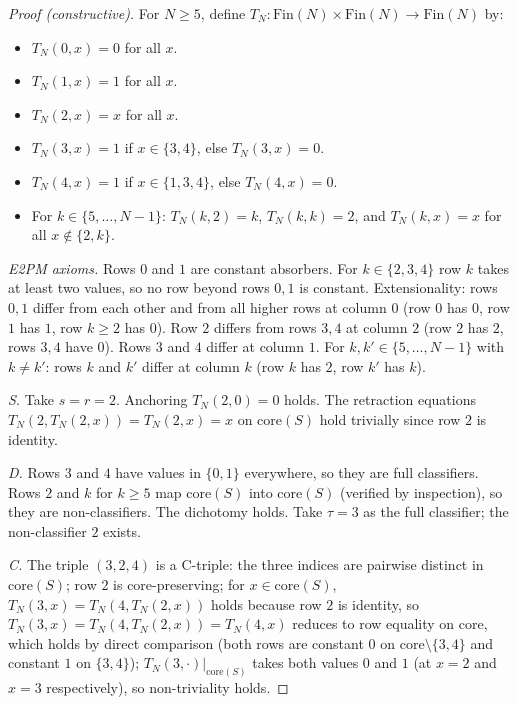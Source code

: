 \documentclass[sigconf,screen]{acmart}
\newcommand{\Fin}{\mathrm{Fin}}
\newcommand{\core}{\mathrm{core}}
\theoremstyle{remark}
\begin{document}
\begin{proof}[Proof (constructive)]
For $N \geq 5$, define $T_N : \Fin(N) \times \Fin(N) \to \Fin(N)$ by:
\begin{itemize}
  \item $T_N(0, x) = 0$ for all $x$.
  \item $T_N(1, x) = 1$ for all $x$.
  \item $T_N(2, x) = x$ for all $x$.
  \item $T_N(3, x) = 1$ if $x \in \{3, 4\}$, else $T_N(3, x) = 0$.
  \item $T_N(4, x) = 1$ if $x \in \{1, 3, 4\}$, else $T_N(4, x) = 0$.
  \item For $k \in \{5, \ldots, N-1\}$: $T_N(k, 2) = k$, $T_N(k, k) = 2$, and $T_N(k, x) = x$ for all $x \notin \{2, k\}$.
\end{itemize}

\emph{E2PM axioms.} Rows $0$ and $1$ are constant absorbers. For $k \in \{2, 3, 4\}$ row $k$ takes at least two values, so no row beyond rows $0, 1$ is constant. Extensionality: rows $0, 1$ differ from each other and from all higher rows at column $0$ (row $0$ has $0$, row $1$ has $1$, row $k \geq 2$ has $0$). Row $2$ differs from rows $3, 4$ at column $2$ (row $2$ has $2$, rows $3, 4$ have $0$). Rows $3$ and $4$ differ at column $1$. For $k, k' \in \{5, \ldots, N-1\}$ with $k \neq k'$: rows $k$ and $k'$ differ at column $k$ (row $k$ has $2$, row $k'$ has $k$).

\emph{S.} Take $s = r = 2$. Anchoring $T_N(2, 0) = 0$ holds. The retraction equations $T_N(2, T_N(2, x)) = T_N(2, x) = x$ on $\core(S)$ hold trivially since row $2$ is identity.

\emph{D.} Rows $3$ and $4$ have values in $\{0, 1\}$ everywhere, so they are full classifiers. Rows $2$ and $k$ for $k \geq 5$ map $\core(S)$ into $\core(S)$ (verified by inspection), so they are non-classifiers. The dichotomy holds. Take $\tau = 3$ as the full classifier; the non-classifier $2$ exists.

\emph{C.} The triple $(3, 2, 4)$ is a C-triple: the three indices are pairwise distinct in $\core(S)$; row $2$ is core-preserving; for $x \in \core(S)$, $T_N(3, x) = T_N(4, T_N(2, x))$ holds because row $2$ is identity, so $T_N(3, x) = T_N(4, T_N(2, x)) = T_N(4, x)$ reduces to row equality on core, which holds by direct comparison (both rows are constant $0$ on $\core \setminus \{3, 4\}$ and constant $1$ on $\{3, 4\}$); $T_N(3, \cdot)|_{\core(S)}$ takes both values $0$ and $1$ (at $x = 2$ and $x = 3$ respectively), so non-triviality holds.
\end{proof}
\end{document}
